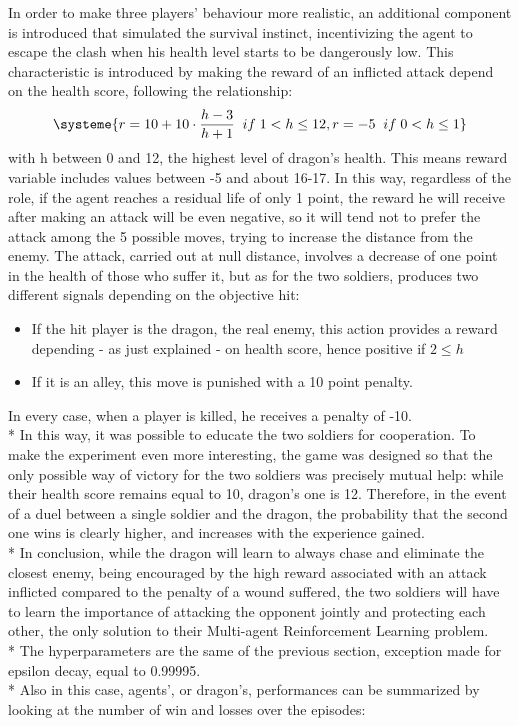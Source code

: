 In order to make three players' behaviour more realistic, an additional component is introduced that simulated the survival instinct, incentivizing the agent to escape the clash when his health level starts to be dangerously low. This characteristic is introduced by making the reward of an inflicted attack depend on the health score, following the relationship:
\[
\systeme{r = 10+10\cdot\frac{h-3}{h+1}\;\;if\;1<h\leq 12, r = -5\;\;if\;0<h\leq 1}
\]
with h between 0 and 12, the highest level of dragon's health. This means reward variable includes values between -5 and about 16-17. In this way, regardless of the role, if the agent reaches a residual life of only 1 point, the reward he will receive after making an attack will be even negative, so it will tend not to prefer the attack among the 5 possible moves, trying to increase the distance from the enemy. The attack, carried out at null distance, involves a decrease of one point in the health of those who suffer it, but as for the two soldiers, produces two different signals depending on the objective hit:
\begin{itemize}[noitemsep, topsep=0ex]
  \item If the hit player is the dragon, the real enemy, this action provides a reward depending - as just explained - on health score, hence positive if $2\leq h$
  \item If it is an alley, this move is punished with a 10 point penalty.
\end{itemize}
In every case, when a player is killed, he receives a penalty of -10.\\*
In this way, it was possible to educate the two soldiers for cooperation. To make the experiment even more interesting, the game was designed so that the only possible way of victory for the two soldiers was precisely mutual help: while their health score remains equal to 10, dragon's one is 12. Therefore, in the event of a duel between a single soldier and the dragon, the probability that the second one wins is clearly higher, and increases with the experience gained.\\*
In conclusion, while the dragon will learn to always chase and eliminate the closest enemy, being encouraged by the high reward associated with an attack inflicted compared to the penalty of a wound suffered, the two soldiers will have to learn the importance of attacking the opponent jointly and protecting each other, the only solution to their Multi-agent Reinforcement Learning problem.\\*
The hyperparameters are the same of the previous section, exception made for epsilon decay, equal to 0.99995.\\*
Also in this case, agents', or dragon's, performances can be summarized by looking at the number of win and losses over the episodes:

